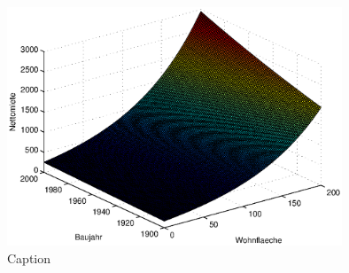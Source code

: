 \begin{figure}[t]
  \centering
  \includegraphics[width=10cm]{figures/nm_wfl_bj_log_approach}
  \caption{Caption}
  \label{fig:3d_result}
\end{figure}








